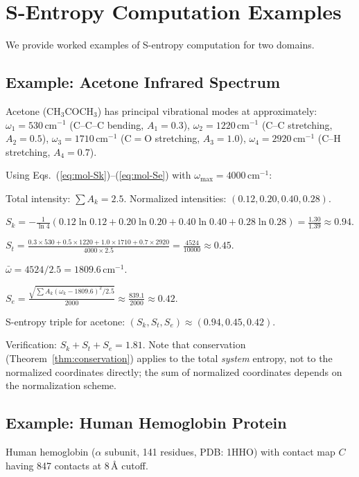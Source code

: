 \documentclass[11pt,twocolumn,a4paper]{article}
\newcommand{\Sk}{S_k}
\newcommand{\St}{S_t}
\newcommand{\Se}{S_e}
\begin{document}
\section{S-Entropy Computation Examples}
\label{app:sentropy}

We provide worked examples of S-entropy computation for two domains.

\subsection{Example: Acetone Infrared Spectrum}

Acetone ($\text{CH}_3\text{COCH}_3$) has principal vibrational
modes at approximately:
$\omega_1 = 530\,\text{cm}^{-1}$ (C--C--C bending, $A_1 = 0.3$),
$\omega_2 = 1220\,\text{cm}^{-1}$ (C--C stretching, $A_2 = 0.5$),
$\omega_3 = 1710\,\text{cm}^{-1}$ (C$=$O stretching, $A_3 = 1.0$),
$\omega_4 = 2920\,\text{cm}^{-1}$ (C--H stretching, $A_4 = 0.7$).

Using Eqs.~(\ref{eq:mol-Sk})--(\ref{eq:mol-Se}) with
$\omega_{\max} = 4000\,\text{cm}^{-1}$:

Total intensity: $\sum A_k = 2.5$.
Normalized intensities: $(0.12, 0.20, 0.40, 0.28)$.

$\Sk = -\frac{1}{\ln 4}(0.12 \ln 0.12 + 0.20 \ln 0.20
+ 0.40 \ln 0.40 + 0.28 \ln 0.28) = \frac{1.30}{1.39} \approx 0.94$.

$\St = \frac{0.3 \times 530 + 0.5 \times 1220 + 1.0 \times 1710
+ 0.7 \times 2920}{4000 \times 2.5} = \frac{4524}{10000} \approx 0.45$.

$\bar{\omega} = 4524/2.5 = 1809.6\,\text{cm}^{-1}$.

$\Se = \frac{\sqrt{\sum A_k(\omega_k - 1809.6)^2 / 2.5}}{2000}
\approx \frac{839.1}{2000} \approx 0.42$.

S-entropy triple for acetone: $(\Sk, \St, \Se) \approx (0.94, 0.45, 0.42)$.

Verification: $\Sk + \St + \Se = 1.81$. Note that conservation
(Theorem~\ref{thm:conservation}) applies to the total
\emph{system} entropy, not to the normalized coordinates directly;
the sum of normalized coordinates depends on the normalization
scheme.

\subsection{Example: Human Hemoglobin Protein}

Human hemoglobin ($\alpha$ subunit, 141 residues, PDB: 1HHO) with
contact map $C$ having 847 contacts at 8\,\AA{} cutoff.
\end{document}
